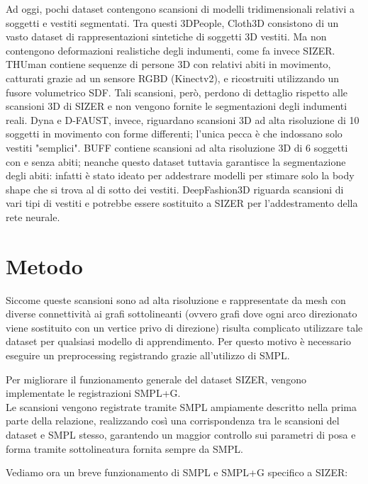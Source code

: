 Ad oggi, pochi dataset contengono scansioni di modelli tridimensionali relativi a soggetti e vestiti segmentati. Tra questi 3DPeople, Cloth3D consistono di un vasto dataset di rappresentazioni sintetiche di soggetti 3D vestiti. Ma non contengono deformazioni realistiche degli indumenti, come fa invece SIZER. THUman contiene sequenze di persone 3D con relativi abiti in movimento, catturati grazie ad un sensore RGBD (Kinectv2), e ricostruiti utilizzando un fusore volumetrico SDF. Tali scansioni, però, perdono di dettaglio rispetto alle scansioni 3D di SIZER e non vengono fornite le segmentazioni degli indumenti reali. Dyna e D-FAUST, invece, riguardano scansioni 3D ad alta risoluzione di  10 soggetti in movimento con forme differenti; l'unica pecca è che indossano solo vestiti "semplici". BUFF contiene scansioni ad alta risoluzione 3D di 6 soggetti con e senza abiti; neanche questo dataset tuttavia garantisce la segmentazione degli abiti: infatti è stato ideato per addestrare modelli per stimare solo la body shape che si trova al di sotto dei vestiti. 
DeepFashion3D riguarda scansioni di vari tipi di vestiti e potrebbe essere sostituito a SIZER per l'addestramento della rete neurale.

\section{Metodo}

\medskip

Siccome queste scansioni sono ad alta risoluzione e rappresentate da mesh con diverse connettività ai grafi sottolineanti (ovvero grafi dove ogni arco direzionato viene sostituito con un vertice privo di direzione) risulta complicato utilizzare tale dataset per qualsiasi modello di apprendimento. Per questo motivo è necessario eseguire un preprocessing registrando grazie all'utilizzo di SMPL.

\medskip

Per migliorare il funzionamento generale del dataset SIZER, vengono implementate le registrazioni SMPL+G.\\
Le scansioni vengono registrate tramite SMPL ampiamente descritto nella prima parte della relazione, realizzando così una corrispondenza tra le scansioni del dataset e SMPL stesso, garantendo un maggior controllo sui parametri di posa e forma tramite sottolineatura fornita sempre da SMPL.


\medskip

Vediamo ora un breve funzionamento di SMPL e SMPL+G specifico a SIZER:

